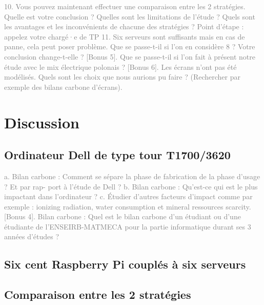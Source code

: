 \documentclass[12pt,a4paper]{paper}
\begin{document}
\textcolor{gray}{10. Vous pouvez maintenant effectuer une comparaison entre les 2 stratégies. Quelle est votre}
\textcolor{gray}{conclusion ? Quelles sont les limitations de l’étude ? Quels sont les avantages et les inconvénients}
\textcolor{gray}{de chacune des stratégies ?}
\textcolor{gray}{Point d’étape : appelez votre chargé·e de TP}
\textcolor{gray}{11. Six serveurs sont suffisants mais en cas de panne, cela peut poser problème. Que se passe-t-il}
\textcolor{gray}{si l’on en considère 8 ? Votre conclusion change-t-elle ?}
\textcolor{gray}{[Bonus 5]. Que se passe-t-il si l’on fait à présent notre étude avec le mix électrique polonais ?}
\textcolor{gray}{[Bonus 6]. Les écrans n’ont pas été modélisés. Quels sont les choix que nous aurions pu faire ?}
\textcolor{gray}{(Rechercher par exemple des bilans carbone d’écrans).}

\section{Discussion}
\subsection{Ordinateur Dell de type tour T1700/3620}
\textcolor{gray}{a. Bilan carbone : Comment se sépare la phase de fabrication de la phase d’usage ? Et par rap-}
\textcolor{gray}{port à l’étude de Dell ?}
\textcolor{gray}{b. Bilan carbone : Qu’est-ce qui est le plus impactant dans l’ordinateur ?}
\textcolor{gray}{c. Étudier d’autres facteurs d’impact comme par exemple : ionizing radiation, water consumption}
\textcolor{gray}{et mineral ressources scarcity.}
\textcolor{gray}{[Bonus 4]. Bilan carbone : Quel est le bilan carbone d’un étudiant ou d’une étudiante de}
\textcolor{gray}{l’ENSEIRB-MATMECA pour la partie informatique durant ses 3 années d’études ?}

\subsection{Six cent Raspberry Pi couplés à six serveurs}
\textcolor{gray}{\lipsum[1-2] }
\subsection{Comparaison entre les 2 stratégies}
\textcolor{gray}{\lipsum[1-2] }
\end{document}

